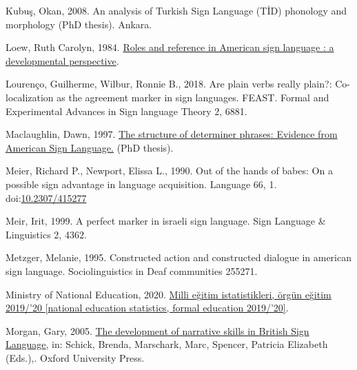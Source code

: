 \documentclass[]{elsarticle} %
\newlength{\cslhangindent}
\newenvironment{CSLReferences}[2] %
 {%
  \setlength{\parindent}{0pt}
  \ifodd #1 \everypar{\setlength{\hangindent}{\cslhangindent}}\ignorespaces\fi
  \ifnum #2 > 0
  \setlength{\parskip}{#2\baselineskip}
  \fi
 }%
 {}
\begin{document}
\begin{CSLReferences}{1}{0}
\leavevmode{}%
Kubuş, Okan, 2008. An analysis of Turkish Sign Language (T{İ}D)
phonology and morphology (PhD thesis). Ankara.

\leavevmode{}%
Loew, Ruth Carolyn, 1984.
\href{https:///paper/Roles-and-reference-in-American-sign-language-\%3A-a-Loew/315c2c539d3bd88fbc13564775141ba4a60ac5aa}{Roles
and reference in American sign language : a developmental perspective}.

\leavevmode{}%
Lourenço, Guilherme, Wilbur, Ronnie B., 2018. Are plain verbs really
plain?: Co-localization as the agreement marker in sign languages.
FEAST. Formal and Experimental Advances in Sign language Theory 2, 6881.

\leavevmode{}%
Maclaughlin, Dawn, 1997.
\href{http://lear.unive.it/jspui/handle/11707/7016}{The structure of
determiner phrases: Evidence from American Sign Language.} (PhD thesis).

\leavevmode{}%
Meier, Richard P., Newport, Elissa L., 1990. Out of the hands of babes:
On a possible sign advantage in language acquisition. Language 66, 1.
doi:\href{https://doi.org/10.2307/415277}{10.2307/415277}

\leavevmode{}%
Meir, Irit, 1999. A perfect marker in israeli sign language. Sign
Language \& Linguistics 2, 4362.

\leavevmode{}%
Metzger, Melanie, 1995. Constructed action and constructed dialogue in
american sign language. Sociolinguistics in Deaf communities 255271.

\leavevmode{}%
Ministry of National Education, 2020.
\href{http://sgb.meb.gov.tr/meb_iys_dosyalar/2020_09/04144812_meb_istatistikleri_orgun_\%20egitim_2019_2020.pdf}{Milli
e{ğ}itim istatistikleri, örgün e{ğ}itim 2019/{'}20 {[}national education
statistics, formal education 2019/{'}20{]}}.

\leavevmode{}%
Morgan, Gary, 2005.
\href{http://www.oxfordscholarship.com/view/10.1093/acprof:oso/9780195180947.001.0001/acprof-9780195180947}{The
development of narrative skills in British Sign Language}, in: Schick,
Brenda, Marschark, Marc, Spencer, Patricia Elizabeth (Eds.),. Oxford
University Press.


\end{CSLReferences}
\end{document}
